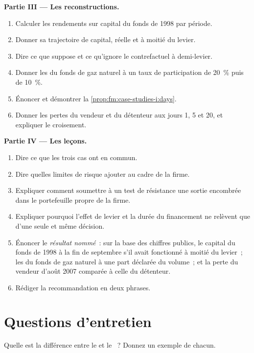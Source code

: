 \begin{problem}
\medskip\noindent\textbf{Partie III --- Les reconstructions.}
\begin{enumerate}[resume]
\item Calculer les rendements sur capital du fonds de 1998 par période.
\item Donner sa trajectoire de capital, réelle et à moitié du levier.
\item Dire ce que suppose et ce qu'ignore le contrefactuel à demi-levier.
\item Donner les  du fonds de gaz naturel à un taux de participation de 20~\% puis de 10~\%.
\item Énoncer et démontrer la \cref{prop:fm:case-studies-i:days}.
\item Donner les pertes du vendeur et du détenteur aux jours 1, 5 et 20, et expliquer le croisement.
\end{enumerate}

\medskip\noindent\textbf{Partie IV --- Les leçons.}
\begin{enumerate}[resume]
\item Dire ce que les trois cas ont en commun.
\item Dire quelles limites de risque ajouter au cadre de la firme.
\item Expliquer comment soumettre à un test de résistance une sortie encombrée dans le portefeuille propre de la firme.
\item Expliquer pourquoi l'effet de levier et la durée du financement ne relèvent que d'une seule et même décision.
\item Énoncer le \emph{résultat nommé}~: sur la base des chiffres publics, le capital du fonds de 1998 à la fin de septembre s'il avait fonctionné à moitié du levier~; les
 du fonds de gaz naturel à une part déclarée du volume~; et la perte du vendeur d'août 2007 comparée à celle du détenteur.
\item Rédiger la recommandation en deux phrases.
\end{enumerate}
\end{problem}

\section{Questions d'entretien}

\begin{interviewq}\label{iq:fm:case-studies-i:1}
Quelle est la différence entre le  et le ~? Donnez un exemple de chacun.
\end{interviewq}

